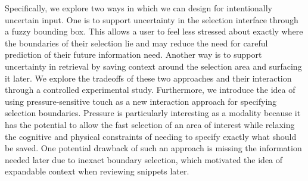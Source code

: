 Specifically, we explore two ways in which we can design for intentionally uncertain input. One is to support uncertainty in the selection interface through a fuzzy bounding box. This allows a user to feel less stressed about exactly where the boundaries of their selection lie and may reduce the need for careful prediction of their future information need. Another way is to support uncertainty in retrieval by saving context around the selection area and surfacing it later. We explore the tradeoffs of these two approaches and their interaction through a controlled experimental study.
Furthermore, we introduce the idea of using pressure-sensitive touch as a new interaction approach for specifying selection boundaries. Pressure is particularly interesting as a modality because it has the potential to allow the fast selection of an area of interest while relaxing the cognitive and physical constraints of needing to specify exactly what should be saved. One potential drawback of such an approach is missing the information needed later due to inexact boundary selection, which motivated the idea of expandable context when reviewing snippets later. 
